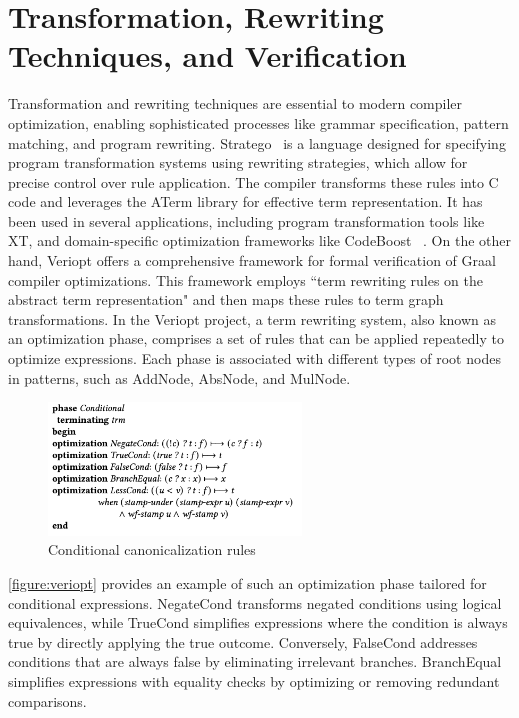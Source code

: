 \section{Transformation, Rewriting Techniques, and Verification}
Transformation and rewriting techniques are essential to modern compiler optimization, enabling sophisticated processes like grammar specification, pattern matching, and program rewriting. Stratego~\cite{Eelco2001} is a language designed for specifying program transformation systems using rewriting strategies, which allow for precise control over rule application. The compiler transforms these rules into C code and leverages the ATerm library for effective term representation. It has been used in several applications, including program transformation tools like XT, and domain-specific optimization frameworks like CodeBoost ~\cite{Eelco2001}. On the other hand, Veriopt \cite{Webb2023} offers a comprehensive framework for formal verification of Graal compiler optimizations. This framework employs  ``term rewriting rules on the abstract term representation" \cite{Webb2023} and then maps these rules to term graph transformations. In the Veriopt project, a term rewriting system, also known as an optimization phase, comprises a set of rules that can be applied repeatedly to optimize expressions. Each phase is associated with different types of root nodes in patterns, such as AddNode, AbsNode, and MulNode. 

\begin{figure}[h]
    \centering
    \includegraphics[width=0.6\textwidth]{Packages/veriopt.png}
    \caption{Conditional canonicalization rules \cite{Webb2023}}
    \label{figure:veriopt}
\end{figure}

\autoref{figure:veriopt} provides an example of such an optimization phase tailored for conditional expressions. NegateCond transforms negated conditions using logical equivalences, while TrueCond simplifies expressions where the condition is always true by directly applying the true outcome. Conversely, FalseCond addresses conditions that are always false by eliminating irrelevant branches. BranchEqual simplifies expressions with equality checks by optimizing or removing redundant comparisons.

